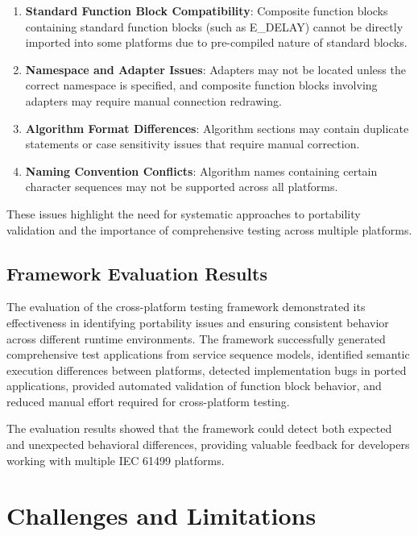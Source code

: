 \begin{enumerate}
    \item \textbf{Standard Function Block Compatibility}: Composite function blocks containing standard function blocks (such as E\_DELAY) cannot be directly imported into some platforms due to pre-compiled nature of standard blocks.
    
    \item \textbf{Namespace and Adapter Issues}: Adapters may not be located unless the correct namespace is specified, and composite function blocks involving adapters may require manual connection redrawing.
    
    \item \textbf{Algorithm Format Differences}: Algorithm sections may contain duplicate statements or case sensitivity issues that require manual correction.
    
    \item \textbf{Naming Convention Conflicts}: Algorithm names containing certain character sequences may not be supported across all platforms.
\end{enumerate}

These issues highlight the need for systematic approaches to portability validation and the importance of comprehensive testing across multiple platforms.

\subsection{Framework Evaluation Results}

The evaluation of the cross-platform testing framework demonstrated its effectiveness in identifying portability issues and ensuring consistent behavior across different runtime environments. The framework successfully generated comprehensive test applications from service sequence models, identified semantic execution differences between platforms, detected implementation bugs in ported applications, provided automated validation of function block behavior, and reduced manual effort required for cross-platform testing.

The evaluation results showed that the framework could detect both expected and unexpected behavioral differences, providing valuable feedback for developers working with multiple IEC 61499 platforms.

\section{Challenges and Limitations}

